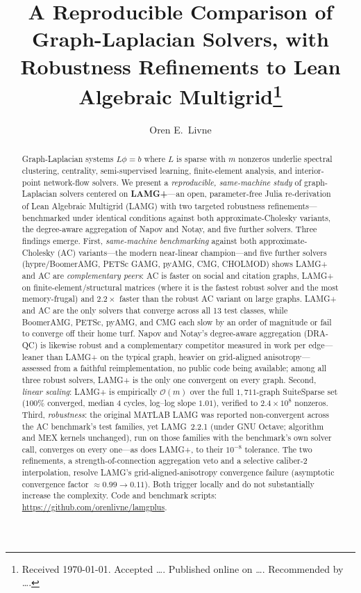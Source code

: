 \documentclass[leqno,letterpaper]{etna}
\title{A Reproducible Comparison of Graph-Laplacian Solvers,
  with Robustness Refinements to Lean Algebraic Multigrid\thanks{%
  Received \today. Accepted \ldots. Published online on \ldots.
  Recommended by \ldots.}}
\author{Oren E.~Livne\footnotemark[2]}
\newcommand{\Om}{\mathcal{O}(m)}
\begin{document}
\maketitle

\renewcommand{\thefootnote}{\fnsymbol{footnote}}

\begin{abstract}
Graph-Laplacian systems $L\phi=b$ where $L$ is sparse with $m$ nonzeros underlie spectral clustering, centrality, semi-supervised
learning, finite-element analysis, and interior-point network-flow solvers. We present a
\emph{reproducible, same-machine study} of graph-Laplacian solvers centered on \textbf{LAMG+}---an open,
parameter-free Julia re-derivation of Lean Algebraic Multigrid (LAMG) with two targeted robustness
refinements---benchmarked under identical conditions against both approximate-Cholesky variants, the
degree-aware aggregation of Napov and Notay, and five further solvers. Three findings emerge.
First, \emph{same-machine benchmarking} against both approximate-Cholesky (AC) variants---the modern
near-linear champion---and five further solvers (hypre/BoomerAMG, PETSc GAMG, pyAMG, CMG, CHOLMOD)
shows LAMG+ and AC are \emph{complementary peers}: AC is faster on social and
citation graphs, LAMG+ on finite-element/structural matrices (where it is the fastest robust solver
and the most memory-frugal) and $2.2\times$ faster than the robust AC variant on large
graphs. LAMG+ and AC are the only solvers that converge across all 13 test classes, while BoomerAMG, PETSc, pyAMG, and CMG each slow by an order of magnitude or fail to converge off their home turf.
Napov and Notay's degree-aware aggregation (DRA-QC) is likewise robust and a complementary competitor measured in work per edge---leaner than LAMG+ on the typical graph, heavier on grid-aligned anisotropy---assessed from a faithful reimplementation, no public code being available; among all three robust solvers, LAMG+ is the only one convergent on every graph.
Second, \emph{linear scaling}: LAMG+ is empirically $\Om$ over the full $1{,}711$-graph SuiteSparse set
($100\%$ converged, median $4$ cycles, log--log slope $1.01$), verified to $2.4\!\times\!10^8$ nonzeros.
Third, \emph{robustness}: the original MATLAB LAMG was reported non-convergent across the
AC benchmark's test families, yet LAMG~2.2.1 (under GNU Octave; algorithm and MEX kernels unchanged), run on those
families with the benchmark's own solver call, converges on every one---as does LAMG+,
to their $10^{-8}$ tolerance. The two refinements, a strength-of-connection aggregation veto and a selective caliber-2 interpolation, resolve LAMG's grid-aligned-anisotropy convergence failure (asymptotic convergence factor $\approx0.99\!\to\!0.11$). Both trigger locally and do not substantially increase the complexity. Code and benchmark scripts: \url{https://github.com/orenlivne/lamgplus}.
\end{abstract}
\end{document}
